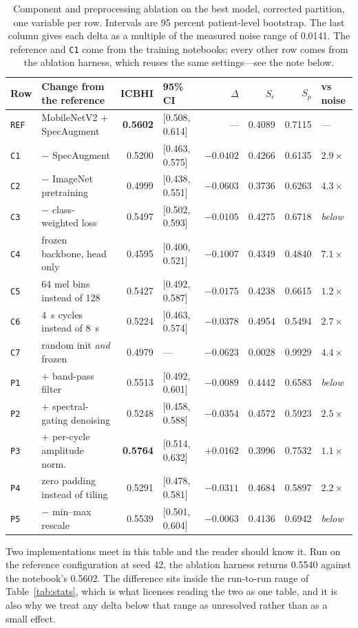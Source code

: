 \documentclass[journal,onecolumn]{IEEEtran}
\newcommand{\best}[1]{\textbf{#1}}
\begin{document}
\begin{table}[!t]
\centering
\caption{Component and preprocessing ablation on the best model, corrected partition, one
variable per row. Intervals are 95 percent patient-level bootstrap. The last column gives each
delta as a multiple of the measured noise range of 0.0141. The reference and \texttt{C1} come
from the training notebooks; every other row comes from the ablation harness, which reuses the
same settings---see the note below.}
\label{tab:ablation}
\footnotesize
\begin{tabular}{llrlrrrl}
\toprule
Row & Change from the reference & ICBHI & 95\% CI & $\Delta$ & $S_e$ & $S_p$ & vs noise \\
\midrule
\texttt{REF} & MobileNetV2 + SpecAugment & \best{0.5602} & [0.508, 0.614] & --- & 0.4089 & 0.7115 & --- \\
\texttt{C1} & $-$ SpecAugment & 0.5200 & [0.463, 0.575] & $-0.0402$ & 0.4266 & 0.6135 & $2.9\times$ \\
\texttt{C2} & $-$ ImageNet pretraining & 0.4999 & [0.438, 0.551] & $-0.0603$ & 0.3736 & 0.6263 & $4.3\times$ \\
\texttt{C3} & $-$ class-weighted loss & 0.5497 & [0.502, 0.593] & $-0.0105$ & 0.4275 & 0.6718 & \emph{below} \\
\texttt{C4} & frozen backbone, head only & 0.4595 & [0.400, 0.521] & $-0.1007$ & 0.4349 & 0.4840 & $7.1\times$ \\
\texttt{C5} & 64 mel bins instead of 128 & 0.5427 & [0.492, 0.587] & $-0.0175$ & 0.4238 & 0.6615 & $1.2\times$ \\
\texttt{C6} & 4~s cycles instead of 8~s & 0.5224 & [0.463, 0.574] & $-0.0378$ & 0.4954 & 0.5494 & $2.7\times$ \\
\texttt{C7} & random init \emph{and} frozen & 0.4979 & --- & $-0.0623$ & 0.0028 & 0.9929 & $4.4\times$ \\
\midrule
\texttt{P1} & $+$ band-pass filter & 0.5513 & [0.492, 0.601] & $-0.0089$ & 0.4442 & 0.6583 & \emph{below} \\
\texttt{P2} & $+$ spectral-gating denoising & 0.5248 & [0.458, 0.588] & $-0.0354$ & 0.4572 & 0.5923 & $2.5\times$ \\
\texttt{P3} & $+$ per-cycle amplitude norm. & \best{0.5764} & [0.514, 0.632] & $+0.0162$ & 0.3996 & 0.7532 & $1.1\times$ \\
\texttt{P4} & zero padding instead of tiling & 0.5291 & [0.478, 0.581] & $-0.0311$ & 0.4684 & 0.5897 & $2.2\times$ \\
\texttt{P5} & $-$ min--max rescale & 0.5539 & [0.501, 0.604] & $-0.0063$ & 0.4136 & 0.6942 & \emph{below} \\
\bottomrule
\end{tabular}

\vspace{2pt}
\footnotesize Two implementations meet in this table and the reader should know it. Run on the
reference configuration at seed 42, the ablation harness returns 0.5540 against the notebook's
0.5602. The difference sits inside the run-to-run range of Table~\ref{tab:stats}, which is what
licenses reading the two as one table, and it is also why we treat any delta below that range
as unresolved rather than as a small effect.
\end{table}
\end{document}
